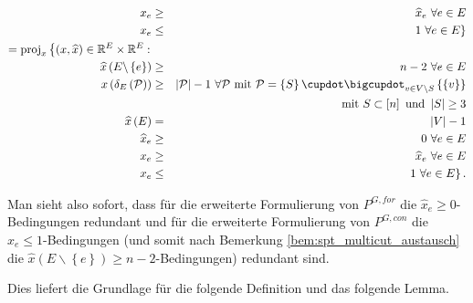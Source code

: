 \documentclass[10p,a4paper,BCOR = 12mm, DIV=15]{scrbook}
\begin{document}
{\begin{eqnarray*}
x_e & \geq & \widehat{x}_e\ \forall e \in E \\
x_e & \leq & \left.1\ \forall e \in E\right\} \\
= \proj_x \left\{\left(x, \widehat{x}\right) \in \mathbb{R}^E \times \mathbb{R}^E: \right. & & \nonumber \\
\widehat{x}\left(E \backslash \left\{e\right\}\right) & \geq & n-2 \ \forall e \in E \\
x\left(\delta_E\left(\mathcal{P}\right)\right) & \geq & \left|\mathcal{P}\right|-1\ \forall \mathcal{P} \textnormal{ mit } \mathcal{P} = \left\{S\right\} \cupdot \bigcupdot_{v \in V \backslash S} \left\{\left\{v\right\}\right\} \\
& & \textnormal{ mit } S \subset \left[n\right] \textnormal{ und } \left|S\right| \geq 3 \\
\widehat{x}\left(E\right) & = & \left|V\right|-1 \nonumber \\
\widehat{x}_e & \geq & 0\ \forall e \in E \\
x_e & \geq & \widehat{x}_e\ \forall e \in E \\
x_e & \leq & \left.1\ \forall e \in E\right\}.
\end{eqnarray*}

Man sieht also sofort, dass für die erweiterte Formulierung von $P^{G, for}$ die $\widehat{x}_e \geq 0$-Bedingungen redundant und für die erweiterte Formulierung von $P^{G, con}$ die $\widehat{x}_e \leq 1$-Bedingungen (und somit nach Bemerkung \ref{bem:spt_multicut_austausch} die $\widehat{x}\left(E \backslash \left\{e\right\}\right) \geq n-2$-Bedingungen) redundant sind.

Dies liefert die Grundlage für die folgende Definition und das folgende Lemma.

}
\end{document}
